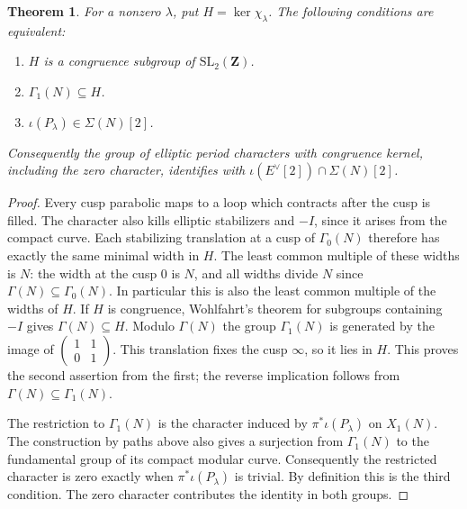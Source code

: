 \documentclass[11pt]{article}
\newtheorem{theorem}{Theorem}[section]
\newcommand{\Z}{\mathbf Z}
\begin{document}
\begin{theorem}\label{th:criterion}
For a nonzero \(\lambda\), put \(H=\ker\chi_\lambda\). The following
conditions are equivalent:
\begin{enumerate}
\item \(H\) is a congruence subgroup of \(\mathrm{SL}_2(\Z)\).
\item \(\Gamma_1(N)\subseteq H\).
\item \(\iota(P_\lambda)\in\Sigma(N)[2]\).
\end{enumerate}
Consequently the group of elliptic period characters with congruence kernel,
including the zero character, identifies with
\(\iota(E^\vee[2])\cap\Sigma(N)[2]\).
\end{theorem}

\begin{proof}
Every cusp parabolic maps to a loop which contracts after the cusp is filled.
The character also kills elliptic stabilizers and \(-I\), since it arises
from the compact curve. Each stabilizing translation at a cusp of
\(\Gamma_0(N)\) therefore has exactly the same minimal width in \(H\).
The least common multiple of these widths is \(N\): the width at the
cusp \(0\) is \(N\), and all widths divide \(N\) since
\(\Gamma(N)\subseteq\Gamma_0(N)\). In particular this is also the least
common multiple of the widths of \(H\). If \(H\) is congruence,
Wohlfahrt's theorem for subgroups containing \(-I\)
\cite[Theorem~2]{Woh} gives \(\Gamma(N)\subseteq H\). Modulo \(\Gamma(N)\)
the group \(\Gamma_1(N)\) is generated by the image of
\(\left(\begin{smallmatrix}1&1\\0&1\end{smallmatrix}\right)\).
This translation fixes the cusp \(\infty\), so it lies in \(H\).
This proves the second assertion from the first; the reverse implication
follows from \(\Gamma(N)\subseteq\Gamma_1(N)\).

The restriction to \(\Gamma_1(N)\) is the character induced by
\(\pi^*\iota(P_\lambda)\) on \(X_1(N)\). The construction by paths
above also gives a surjection from \(\Gamma_1(N)\) to the fundamental
group of its compact modular curve. Consequently the restricted character
is zero exactly when \(\pi^*\iota(P_\lambda)\) is trivial. By definition
this is the third condition. The zero character contributes the identity
in both groups.
\end{proof}
\end{document}
